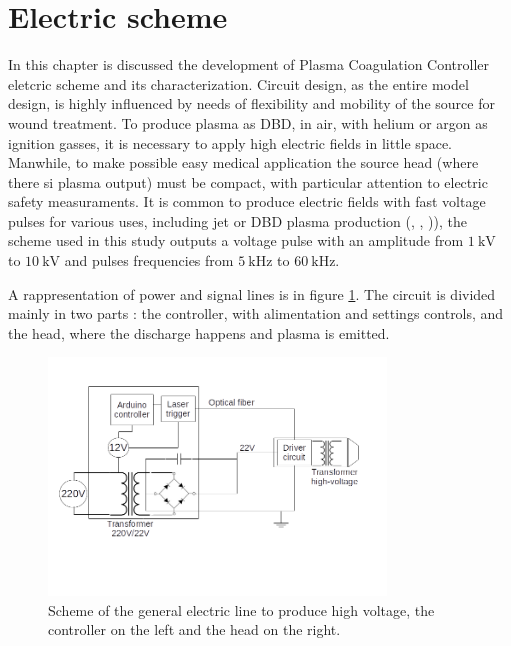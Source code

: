 \section{Electric scheme}
In this chapter is discussed the development of Plasma Coagulation Controller eletcric scheme and its characterization. Circuit design, as the entire model design, is highly influenced by needs of flexibility and mobility of the source for wound treatment. To produce plasma as DBD, in air, with helium or argon as ignition gasses, it is necessary to apply high electric fields in little space. Manwhile, to make possible easy medical application the source head (where there si plasma output) must be compact, with particular attention to electric safety measuraments.
It is common to produce electric fields with fast voltage pulses for various uses, including jet or DBD plasma production (\cite{Upadhyay:hvpulse}, \cite{Jarrige:plumecharacteristics}, \cite{Darny:jetplume})), the scheme used in this study outputs a voltage pulse with an amplitude from $\SI{1}{\kilo\volt}$ to $\SI{10}{\kilo\volt}$ and pulses frequencies from $\SI{5}{\kilo\hertz}$ to $\SI{60}{\kilo\hertz}$.

A rappresentation of power and signal lines is in figure \ref{fig:electricline}. The circuit is divided mainly in two parts %
: the controller, with alimentation and settings controls, and the head, where the discharge happens and plasma is emitted.
\begin{figure}
 \centering
 \includegraphics[width=0.8\textwidth]{Images/Electric/Linea_elettrica.png}
 \caption{Scheme of the general electric line to produce high voltage, the controller on the left and the head on the right.}
 \label{fig:electricline}
\end{figure}

